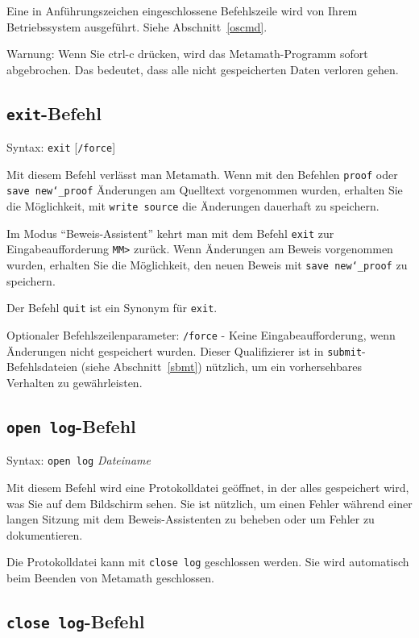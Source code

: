 Eine in Anführungszeichen eingeschlossene Befehlszeile wird von Ihrem Betriebssystem ausgeführt. Siehe Abschnitt~\ref{oscmd}.

{Warnung:} Wenn Sie {\sc ctrl-c} drücken, wird das Metamath-Programm sofort abgebrochen.  Das bedeutet, dass alle nicht gespeicherten Daten verloren gehen.


\subsection{\texttt{exit}-Befehl}

Syntax:  \texttt{exit} [\texttt{/force}]

Mit diesem Befehl verlässt man Metamath.  Wenn mit den Befehlen \texttt{proof} oder \texttt{save new{\char`\_}proof} Änderungen am Quelltext vorgenommen wurden, erhalten Sie die Möglichkeit, mit \texttt{write source} die Änderungen dauerhaft zu speichern.

Im Modus "`Beweis-Assistent"' kehrt man mit dem Befehl \texttt{exit} zur Eingabeaufforderung \verb/MM>/ zurück. Wenn Änderungen am Beweis vorgenommen wurden, erhalten Sie die Möglichkeit, den neuen Beweis mit \texttt{save new{\char`\_}proof} zu speichern.

Der Befehl \texttt{quit} ist ein Synonym für \texttt{exit}.

Optionaler Befehlszeilenparameter:
\texttt{/force} - Keine Eingabeaufforderung, wenn Änderungen nicht gespeichert wurden.  Dieser Qualifizierer ist in \texttt{submit}-Befehlsdateien (siehe Abschnitt~\ref{sbmt}) nützlich, um ein vorhersehbares Verhalten zu gewährleisten.


\subsection{\texttt{open log}-Befehl}

Syntax:  \texttt{open log} {\em Dateiname}

Mit diesem Befehl wird eine Protokolldatei geöffnet, in der alles gespeichert wird, was Sie auf dem Bildschirm sehen.  Sie ist nützlich, um einen Fehler während einer langen Sitzung mit dem Beweis-Assistenten zu beheben oder um Fehler zu dokumentieren.

Die Protokolldatei kann mit \texttt{close log} geschlossen werden.  Sie wird automatisch beim Beenden von Metamath geschlossen.


\subsection{\texttt{close log}-Befehl}

